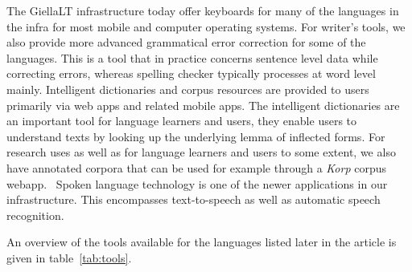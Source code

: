 \documentclass[free]{flammie}
\begin{document}
The GiellaLT infrastructure today offer keyboards for many of the languages in
the infra for most mobile and computer operating systems.  For writer's tools,
we also provide more advanced grammatical error correction for some of the
languages. This is a tool that in practice concerns sentence level data while
correcting errors, whereas spelling checker typically processes at word level
mainly.  Intelligent dictionaries and corpus resources are provided to users
primarily via web apps and related mobile apps.  The intelligent dictionaries
are an important tool for language learners and users, they enable users to
understand texts by looking up the underlying lemma of inflected forms.  For
research uses as well as for language learners and users to some extent, we also
have annotated corpora that can be used for example through a \textit{Korp}
corpus webapp.~\cite{borin2012korp} Spoken language technology is one of the
newer applications in our infrastructure.  This encompasses text-to-speech as
well as automatic speech recognition.

An overview of the tools available for the languages listed later in the article
is given in table~\ref{tab:tools}.
\end{document}
